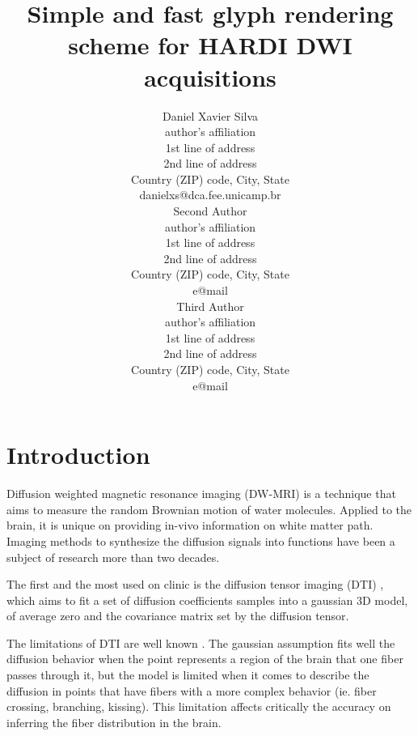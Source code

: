 \documentclass[twoside,twocolumn,10pt]{article}
\title{Simple and fast glyph rendering scheme for HARDI DWI acquisitions}
\author{
\parbox{0.25\textwidth}{\centering
Daniel Xavier Silva\\[1mm]
author's affiliation\\
1st line of address\\
2nd line of address\\
Country (ZIP) code, City, State\\[1mm]
danielxs@dca.fee.unicamp.br
}
\hspace{0.05\textwidth}
\parbox{0.25\textwidth}{\centering
Second Author\\[1mm]
author's affiliation\\
1st line of address\\
2nd line of address\\
Country (ZIP) code, City, State\\[1mm]
e@mail
}
\hspace{0.05\textwidth}
\parbox{0.25\textwidth}{\centering
Third Author\\[1mm]
author's affiliation\\
1st line of address\\
2nd line of address\\
Country (ZIP) code, City, State\\[1mm]
e@mail
}
}
\begin{document}





\section{Introduction}

\copyrightspace

Diffusion weighted magnetic resonance imaging (DW-MRI) is a technique that aims to measure the random Brownian motion of water molecules. Applied to the brain, it is unique on providing in-vivo information on white matter path. Imaging methods to synthesize the diffusion signals into functions have been a subject of research more than two decades.

The first and the most used on clinic is the diffusion tensor imaging (DTI) \cite{Basser1994}, which aims to fit a set of diffusion coefficients samples into a gaussian 3D model, of average zero and the covariance matrix set by the diffusion tensor.

The limitations of DTI are well known \cite{descoteaux2015,SCHILLING2019194}. The gaussian assumption fits well the diffusion behavior when the point represents a region of the brain that one fiber passes through it, but the model is limited when it comes to describe the diffusion in points that have fibers with a more complex behavior (ie. fiber crossing, branching, kissing). This limitation affects critically the accuracy on inferring the fiber distribution in the brain.
\end{document}

